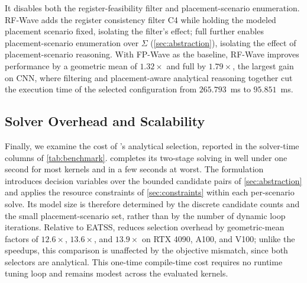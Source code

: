 It disables both the register-feasibility filter and placement-scenario enumeration. RF-Wave adds the register consistency filter C4 while holding the modeled placement scenario fixed, isolating the filter's effect; full \name further enables placement-scenario enumeration over \(\Sigma\) (\autoref{sec:abstraction}), isolating the effect of placement-scenario reasoning. With FP-Wave as the baseline, RF-Wave improves performance by a geometric mean of $1.32\times$ and full \name by $1.79\times$, the largest gain on CNN, where filtering and placement-aware analytical reasoning together cut the execution time of the selected configuration from $265.793$~ms to $95.851$~ms.

\subsection{Solver Overhead and Scalability}
\label{subsec:overhead}

Finally, we examine the cost of \name's analytical selection, reported in the solver-time columns of \autoref{tab:benchmark}. \name completes its two-stage solving in well under one second for most kernels and in a few seconds at worst. The formulation introduces decision variables over the bounded candidate pairs of \autoref{sec:abstraction} and applies the resource constraints of \autoref{sec:constraints} within each per-scenario solve. Its model size is therefore determined by the discrete candidate counts and the small placement-scenario set, rather than by the number of dynamic loop iterations. Relative to EATSS, \name reduces selection overhead by geometric-mean factors of $12.6\times$, $13.6\times$, and $13.9\times$ on RTX 4090, A100, and V100; unlike the speedups, this comparison is unaffected by the objective mismatch, since both selectors are analytical. This one-time compile-time cost requires no runtime tuning loop and remains modest across the evaluated kernels.
